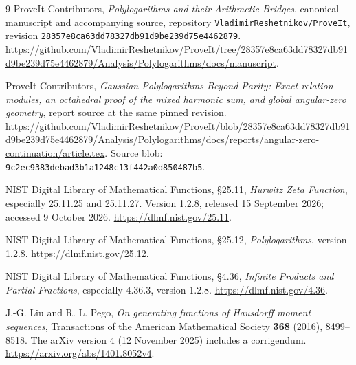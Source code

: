 \documentclass[11pt]{article}
\numberwithin{equation}{section}
\theoremstyle{definition}\newtheorem{definition}[theorem]{Definition}
\theoremstyle{remark}\newtheorem{remark}[theorem]{Remark}
\newcommand{\basecommit}{\nolinkurl{28357e8ca63dd78327db91d9be239d75e4462879}}
\begin{document}
\clearpage
{}
\begin{thebibliography}{9}
ProveIt Contributors,
\emph{Polylogarithms and their Arithmetic Bridges}, canonical manuscript
and accompanying source, repository \texttt{VladimirReshetnikov/ProveIt},
revision \basecommit.
\url{https://github.com/VladimirReshetnikov/ProveIt/tree/28357e8ca63dd78327db91d9be239d75e4462879/Analysis/Polylogarithms/docs/manuscript}.

ProveIt Contributors,
\emph{Gaussian Polylogarithms Beyond Parity: Exact relation modules,
an octahedral proof of the mixed harmonic sum, and global angular-zero
geometry}, report source at the same pinned revision.
\url{https://github.com/VladimirReshetnikov/ProveIt/blob/28357e8ca63dd78327db91d9be239d75e4462879/Analysis/Polylogarithms/docs/reports/angular-zero-continuation/article.tex}.
Source blob: \nolinkurl{9c2ec9383debad3b1a1248c13f442a0d850487b5}.

NIST Digital Library of Mathematical Functions,
\S25.11, \emph{Hurwitz Zeta Function}, especially 25.11.25 and 25.11.27.
Version 1.2.8, released 15 September 2026; accessed 9 October 2026.
\url{https://dlmf.nist.gov/25.11}.

NIST Digital Library of Mathematical Functions,
\S25.12, \emph{Polylogarithms}, version 1.2.8.
\url{https://dlmf.nist.gov/25.12}.

NIST Digital Library of Mathematical Functions,
\S4.36, \emph{Infinite Products and Partial Fractions}, especially 4.36.3,
version 1.2.8.
\url{https://dlmf.nist.gov/4.36}.

J.-G. Liu and R. L. Pego,
\emph{On generating functions of Hausdorff moment sequences},
Transactions of the American Mathematical Society \textbf{368} (2016),
8499--8518. The arXiv version 4 (12 November 2025) includes a corrigendum.
\url{https://arxiv.org/abs/1401.8052v4}.
\end{thebibliography}
\end{document}
